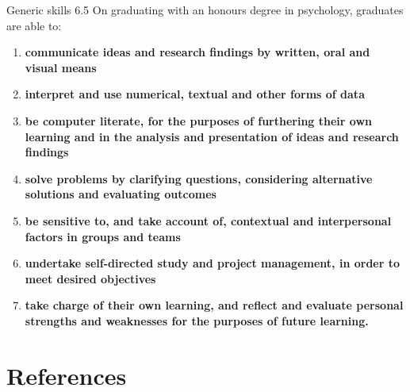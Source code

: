 \documentclass[
  11pt,
  letterpaper,
  oneside,
  open=any]{scrbook}
\begin{document}
Generic skills 6.5 On graduating with an honours degree in psychology,
graduates are able to:

\begin{enumerate}
\def\labelenumi{\arabic{enumi}.}
\item
  \textbf{communicate ideas and research findings by written, oral and
  visual means}
\item
  \textbf{interpret and use numerical, textual and other forms of data}
\item
  \textbf{be computer literate, for the purposes of furthering their own
  learning and in the analysis and presentation of ideas and research
  findings}
\item
  \textbf{solve problems by clarifying questions, considering
  alternative solutions and evaluating outcomes}
\item
  \textbf{be sensitive to, and take account of, contextual and
  interpersonal factors in groups and teams}
\item
  \textbf{undertake self-directed study and project management, in order
  to meet desired objectives}
\item
  \textbf{take charge of their own learning, and reflect and evaluate
  personal strengths and weaknesses for the purposes of future
  learning.}
\end{enumerate}

\hypertarget{references}{%
\chapter*{References}\label{references}}

\end{document}

